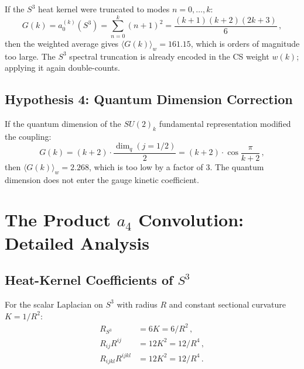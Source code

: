\documentclass[12pt,a4paper]{article}
\theoremstyle{definition}
\theoremstyle{remark}
\begin{document}
If the $S^3$ heat kernel were truncated to modes $n = 0, \ldots, k$:
\begin{equation}
G(k) = a_0^{(k)}(S^3)
= \sum_{n=0}^{k}(n+1)^2 = \frac{(k+1)(k+2)(2k+3)}{6}\,,
\end{equation}
then the weighted average gives $\langle G(k) \rangle_w = 161.15$,
which is orders of magnitude too large.  The $S^3$ spectral truncation
is already encoded in the CS weight $w(k)$; applying it again double-counts.

\subsection{Hypothesis 4: Quantum Dimension Correction}

If the quantum dimension of the $SU(2)_k$ fundamental representation
modified the coupling:
\begin{equation}
G(k) = (k+2) \cdot \frac{\dim_q(j{=}1/2)}{2}
= (k+2) \cdot \cos\!\frac{\pi}{k+2}\,,
\end{equation}
then $\langle G(k) \rangle_w = 2.268$, which is too low by a factor
of 3.  The quantum dimension does not enter the gauge kinetic coefficient.

\section{The Product $a_4$ Convolution: Detailed Analysis}
\label{sec:product-a4}

\subsection{Heat-Kernel Coefficients of $S^3$}

For the scalar Laplacian on $S^3$ with radius $R$ and constant sectional
curvature $K = 1/R^2$:
\begin{align}
R_{S^3} &= 6K = 6/R^2\,, \\
R_{ij}R^{ij} &= 12K^2 = 12/R^4\,, \\
R_{ijkl}R^{ijkl} &= 12K^2 = 12/R^4\,.
\end{align}
\end{document}
